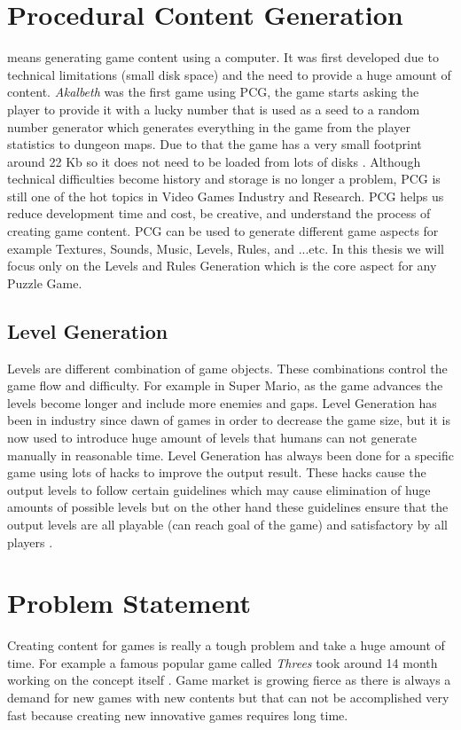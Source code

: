\section{Procedural Content Generation}
 means generating game content using a computer. It was first developed due to technical limitations (small disk space) and the need to provide a huge amount of content. \emph{Akalbeth} was the first game using PCG, the game starts asking the player to provide it with a lucky number that is used as a seed to a random number generator which generates everything in the game from the player statistics to dungeon maps. Due to that the game has a very small footprint around 22 Kb so it does not need to be loaded from lots of disks \cite{pcgFirstGame}. Although technical difficulties become history and storage is no longer a problem, PCG is still one of the hot topics in Video Games Industry and Research. PCG helps us reduce development time and cost, be creative, and understand the process of creating game content. PCG can be used to generate different game aspects for example Textures, Sounds, Music, Levels, Rules, and ...etc. In this thesis we will focus only on the Levels and Rules Generation which is the core aspect for any Puzzle Game.

\subsection{Level Generation}
Levels are different combination of game objects. These combinations control the game flow and difficulty. For example in Super Mario, as the game advances the levels become longer and include more enemies and gaps. Level Generation has been in industry since dawn of games in order to decrease the game size, but it is now used to introduce huge amount of levels that humans can not generate manually in reasonable time. Level Generation has always been done for a specific game using lots of hacks to improve the output result. These hacks cause the output levels to follow certain guidelines which may cause elimination of huge amounts of possible levels but on the other hand these guidelines ensure that the output levels are all playable (can reach goal of the game) and satisfactory by all players \cite{mcGenerateEverything}.

\section{Problem Statement}
Creating content for games is really a tough problem and take a huge amount of time. For example a famous popular game called \emph{Threes} took around 14 month working on the concept itself \cite{threesTime}. Game market is growing fierce as there is always a demand for new games with new contents but that can not be accomplished very fast because creating new innovative games requires long time.\\\par

